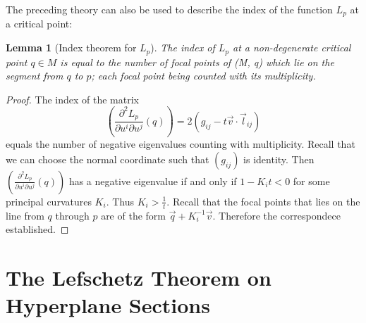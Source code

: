 \documentclass[12pt]{article}
\newtheorem{lem}[thm]{Lemma}
\newcommand{\vect}[1]{\vec{#1}}
\begin{document}
The preceding theory can also be used to describe the index of the function
$L_p$ at a critical point:

\begin{lem}[Index theorem for $L_p$]
  The index of $L_p$ at a non-degenerate critical point $q \in M$ is equal to
  the number of focal points of (M, q) which lie on the segment from $q$ to $p$;
  each focal point being counted with its multiplicity.
\end{lem}

\begin{proof}
  The index of the matrix 
  \begin{equation}
    \left( \frac{\partial^2 L_p}{\partial u^i \partial
        u^j}(q) \right) = 2(g_{ij}-t\vect{v} \cdot \vect{l}_{ij})
  \end{equation}
  equals the number of negative eigenvalues counting with multiplicity. Recall
  that we can choose the normal coordinate such that $(g_{ij})$ is
  identity. Then$\left( \frac{\partial^2 L_p}{\partial u^i \partial u^j}(q)
  \right)$ has a negative eigenvalue if and only if $1-K_it < 0$ for some
  principal curvatures $K_i$. Thus $K_i > \frac{1}{t}$. Recall that the focal
    points that lies on the line from $q$ through $p$ are of the form
    $\vect{q}+K_i^{-1}\vect{v}$. Therefore the correspondece established. 
    
\end{proof}

\section{The Lefschetz Theorem on Hyperplane Sections}
\end{document}
